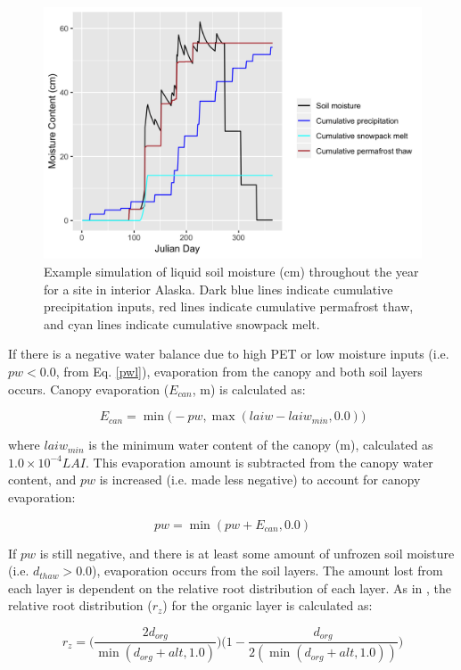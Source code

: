 \documentclass[a4paper, 12pt] {report}
\begin{document}
\begin{figure}
  \includegraphics[width=0.8\linewidth]{Figures/Water_cumm.png}
  \caption{Example simulation of liquid soil moisture (cm) throughout the year for a site in interior Alaska. Dark blue lines indicate cumulative precipitation inputs, red lines indicate cumulative permafrost thaw, and cyan lines indicate cumulative snowpack melt.}
  \label{fig:liquidcumm}
\end{figure} 

If there is a negative water balance due to high PET or low moisture inputs (i.e. $pw < 0.0$, from Eq. \ref{pwl}), evaporation from the canopy and both soil layers occurs. Canopy evaporation ($E_{can}$, m) is calculated as:

\begin{equation}
E_{can} = \min\Big(-pw, \max(laiw - laiw_{min}, 0.0)\Big)
\end{equation}

where $laiw_{min}$ is the minimum water content of the canopy (m), calculated as $1.0\times10^{-4}LAI$. This evaporation amount is subtracted from the canopy water content, and $pw$ is increased (i.e. made less negative) to account for canopy evaporation:

\begin{equation}
pw = \min(pw + E_{can}, 0.0)
\end{equation}

If $pw$ is still negative, and there is at least some amount of unfrozen soil moisture (i.e. $d_{thaw} > 0.0$), evaporation occurs from the soil layers. The amount lost from each layer is dependent on the relative root distribution of each layer. As in , the relative root distribution ($r_z$) for the organic layer is calculated as:

\begin{equation} \label{rooteq}
r_z =\Big( \frac{2d_{org}}{\min(d_{org} + alt, 1.0)}\Big)\Big(1 - \frac{d_{org}}{2(\min(d_{org} + alt, 1.0))}\Big)
\end{equation}
\end{document}
